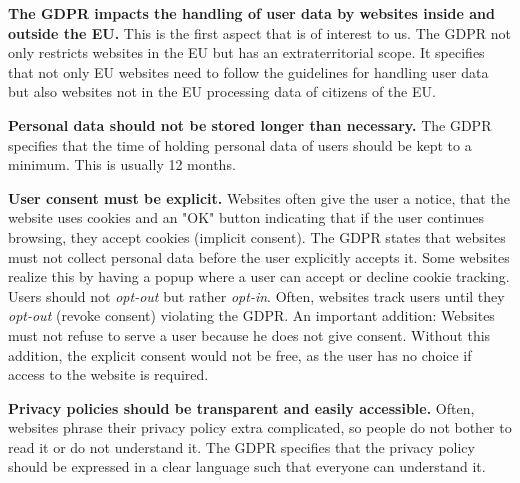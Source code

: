 \textbf{The GDPR impacts the handling of user data by websites inside and outside the EU.} This is the first
aspect that is of interest to us. The GDPR not only restricts websites in the EU but has an extraterritorial scope.
It specifies that not only EU websites need to follow the guidelines for handling user data but also websites not in the
EU processing data of citizens of the EU.

\textbf{Personal data should not be stored longer than necessary.} The GDPR specifies that the time of holding personal data of
users should be kept to a minimum. This is usually 12 months.

\textbf{User consent must be explicit.} Websites often give the user a notice, that the website uses cookies and an "OK" button
indicating that if the user continues browsing, they accept cookies (implicit consent). The GDPR states
that websites must not collect personal data before the user explicitly accepts it. Some websites realize
this by having a popup where a user can accept or decline cookie tracking. Users should not
\emph{opt-out} but rather \emph{opt-in}. Often, websites track users until they \emph{opt-out} (revoke consent) violating
the GDPR. An important addition: Websites must not refuse to serve a user because he does not give consent. Without this
addition, the explicit consent would not be free, as the user has no choice if access to the website is required.

\textbf{Privacy policies should be transparent and easily accessible.} Often, websites phrase their privacy policy
extra complicated, so people do not bother to read it or do not understand it. The GDPR specifies that the privacy policy
should be expressed in a clear language such that everyone can understand it.

